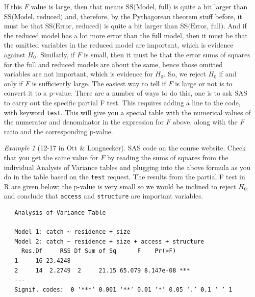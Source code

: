\documentclass[a4paper, 12pt]{article}
\theoremstyle{plain}
\theoremstyle{definition}
\theoremstyle{remark}
\newtheorem*{example}{Example}
\begin{document}
If this $F$ value is large, then that means $\text{SS(Model, full)}$ is quite a bit larger than $\text{SS(Model, reduced)}$ and, therefore, by the Pythagorean theorem stuff before, it must be that $\text{SS(Error, reduced)}$ is quite a bit larger than $\text{SS(Error, full)}$.  And if the reduced model has a lot more error than the full model, then it must be that the omitted variables in the reduced model are important, which is evidence against $H_0$.  Similarly, if $F$ is small, then it must be that the error sums of squares for the full and reduced models are about the same, hence those omitted variables are not important, which is evidence for $H_0$.  So, we reject $H_0$ if and only if $F$ is sufficiently large.  The easiest way to tell if $F$ is large or not is to convert it to a p-value.  There are a number of ways to do this, one is to ask SAS to carry out the specific partial F test.  This requires adding a line to the code, with keyword {\tt test}.  This will give you a special table with the numerical values of the numerator and denominator in the expression for $F$ above, along with the $F$ ratio and the corresponding p-value.  

\begin{example}[12-17 in Ott \& Longnecker]
SAS code on the course website.  Check that you get the same value for $F$ by reading the sums of squares from the individual Analysis of Variance tables and plugging into the above formula as you do in the table based on the {\tt test} request.  The results from the partial F test in R are given below; the p-value is very small so we would be inclined to reject $H_0$, and conclude that {\tt access} and {\tt structure} are important variables. 
{\small 
\begin{verbatim}
   Analysis of Variance Table

   Model 1: catch ~ residence + size
   Model 2: catch ~ residence + size + access + structure
     Res.Df     RSS Df Sum of Sq      F    Pr(>F)    
   1     16 23.4248                                  
   2     14  2.2749  2     21.15 65.079 8.147e-08 ***
   ---
   Signif. codes:  0 ‘***’ 0.001 ‘**’ 0.01 ‘*’ 0.05 ‘.’ 0.1 ‘ ’ 1
\end{verbatim}
}
\end{example}
\end{document}
